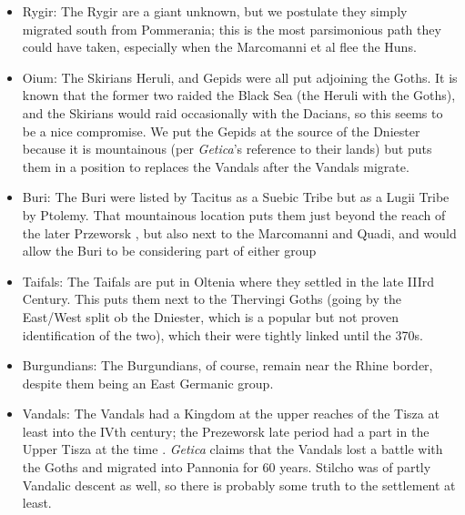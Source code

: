 \documentclass{article}
\begin{document}
	\begin{itemize}
		\item Rygir:\newline
		The Rygir are a giant unknown, but we postulate they simply migrated south from Pommerania; this is the most parsimonious path they could have taken, especially when the Marcomanni et al flee the Huns.
		\item Oium:\newline
		The Skirians Heruli, and Gepids were all put adjoining the Goths.
		It is known that the former two raided the Black Sea (the Heruli with the Goths), and the Skirians would raid occasionally with the Dacians, so this seems to be a nice compromise.
		We put the Gepids at the source of the Dniester because it is mountainous (per \textit{Getica}'s reference to their lands) but puts them in a position to replaces the Vandals after the Vandals migrate.
		\item Buri:\newline
		The Buri were listed by Tacitus as a Suebic Tribe but as a Lugii Tribe by Ptolemy.
		That mountainous location puts them just beyond the reach of the later Przeworsk \cite{HeatherEmpiresAndBarbarians,PrzeworskHistory}, but also next to the Marcomanni and Quadi, and would allow the Buri to be considering part of either group
		\item Taifals:\newline
		The Taifals are put in Oltenia where they settled in the late IIIrd Century.
		This puts them next to the Thervingi Goths (going by the East/West split ob the Dniester, which is a popular but not proven identification of the two), which their were tightly linked until the 370s.
		\item Burgundians:\newline
		The Burgundians, of course, remain near the Rhine border, despite them being an East Germanic group.
		\item Vandals:\newline
		The Vandals had a Kingdom at the upper reaches of the Tisza at least into the IVth century; the Prezeworsk late period had a part in the Upper Tisza at the time \cite{PrzeworskHistory}.\newline
		\textit{Getica} claims that the Vandals lost a battle with the Goths and migrated into Pannonia for 60 years.\newline
		Stilcho was of partly Vandalic descent as well, so there is probably some truth to the settlement at least.\newline

\end{itemize}
\end{document}
